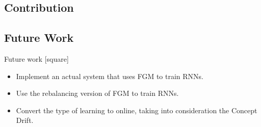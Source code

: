 \subsection{Contribution}\label{subsec:contribution}

\subsection{Future Work}\label{subsec:future-work}

\begin{frame}{Future work}
    [square]
    \begin{itemize}
        \item{Implement an actual system that uses FGM to train RNNs.}
        \vspace{1cm}
        \item{Use the rebalancing version of FGM to train RNNs.}
        \vspace{1cm}
        \item{Convert the type of learning to online, taking into consideration the Concept Drift.}
    \end{itemize}
\end{frame}